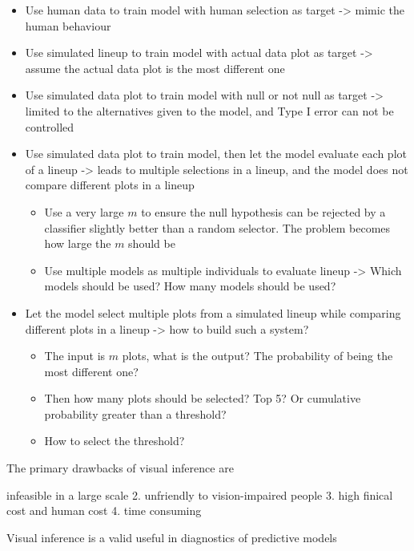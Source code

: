 \documentclass{monashthesis}
\theoremstyle{definition}
\theoremstyle{definition}
\theoremstyle{definition}
\theoremstyle{definition}
\theoremstyle{remark}
\begin{document}
\begin{itemize}
\tightlist
\item
  Use human data to train model with human selection as target -\textgreater{} mimic the human behaviour
\item
  Use simulated lineup to train model with actual data plot as target -\textgreater{} assume the actual data plot is the most different one
\item
  Use simulated data plot to train model with null or not null as target -\textgreater{} limited to the alternatives given to the model, and Type I error can not be controlled
\item
  Use simulated data plot to train model, then let the model evaluate each plot of a lineup -\textgreater{} leads to multiple selections in a lineup, and the model does not compare different plots in a lineup

  \begin{itemize}
  \tightlist
  \item
    Use a very large \(m\) to ensure the null hypothesis can be rejected by a classifier slightly better than a random selector. The problem becomes how large the \(m\) should be
  \item
    Use multiple models as multiple individuals to evaluate lineup -\textgreater{} Which models should be used? How many models should be used?
  \end{itemize}
\item
  Let the model select multiple plots from a simulated lineup while comparing different plots in a lineup -\textgreater{} how to build such a system?

  \begin{itemize}
  \tightlist
  \item
    The input is \(m\) plots, what is the output? The probability of being the most different one?
  \item
    Then how many plots should be selected? Top 5? Or cumulative probability greater than a threshold?
  \item
    How to select the threshold?
  \end{itemize}
\end{itemize}

The primary drawbacks of visual inference are

infeasible in a large scale
2. unfriendly to vision-impaired people 3. high finical cost and human cost
4. time consuming

Visual inference is a valid useful in diagnostics of predictive models
\end{document}
